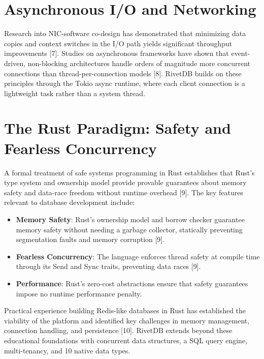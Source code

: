 \documentclass[12pt,a4paper]{report}
\begin{document}
\section{Asynchronous I/O and Networking}

Research into NIC-software co-design has demonstrated that minimizing data copies and context switches in the I/O path yields significant throughput improvements [7]. Studies on asynchronous frameworks have shown that event-driven, non-blocking architectures handle orders of magnitude more concurrent connections than thread-per-connection models [8]. RivetDB builds on these principles through the Tokio async runtime, where each client connection is a lightweight task rather than a system thread.

\section{The Rust Paradigm: Safety and Fearless Concurrency}

A formal treatment of safe systems programming in Rust establishes that Rust's type system and ownership model provide provable guarantees about memory safety and data-race freedom without runtime overhead [9]. The key features relevant to database development include:

\begin{itemize}[leftmargin=2.5em]
    \item \textbf{Memory Safety}: Rust's ownership model and borrow checker guarantee memory safety without needing a garbage collector, statically preventing segmentation faults and memory corruption [9].
    \item \textbf{Fearless Concurrency}: The language enforces thread safety at compile time through its Send and Sync traits, preventing data races [9].
    \item \textbf{Performance}: Rust's zero-cost abstractions ensure that safety guarantees impose no runtime performance penalty.
\end{itemize}

Practical experience building Redis-like databases in Rust has established the viability of the platform and identified key challenges in memory management, connection handling, and persistence [10]. RivetDB extends beyond these educational foundations with concurrent data structures, a SQL query engine, multi-tenancy, and 10 native data types.

\end{document}
